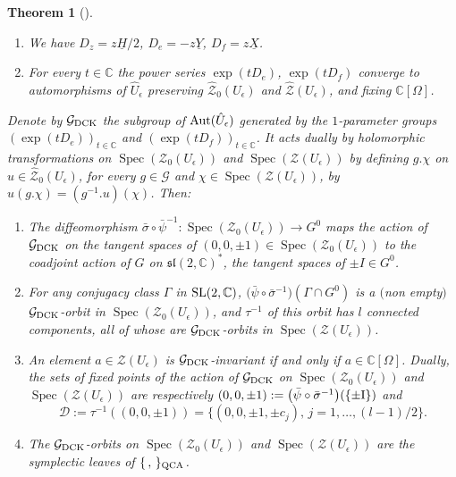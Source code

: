 \documentclass[pdftex]{sigma}%
\numberwithin{equation}{section}
\numberwithin{figure}{section}
\newtheorem{teo}{Theorem}[section]
\newcommand{\Ue}{U_\epsilon}
\newcommand{\e}{\epsilon}
\newcommand{\mc}{\mathbb{C}}
\newcommand{\Gg}{{\mathcal G}}
\newcommand{\ra}{\rightarrow}
\begin{document}
\begin{teo} [{\cite{DC-K-P1,DC-K-P2}}]\qquad\label{DCKPteo}

\begin{enumerate}\itemsep=0pt
\item[$(a)$] We have $D_{z} = z \underline{H}/2$, $D_e= -z\underline{Y}$, $D_f=z\underline{X}$.

\item[$(b)$] For every $t\in \mc$ the power series $\exp(tD_e)$, $\exp(tD_f)$ converge to automorphisms of $\hat{U}_\e$ preserving $\hat{\mathcal{Z}}_0(U_\epsilon)$ and $\hat{\mathcal{Z}}(U_\epsilon)$, and fixing $\mc[\Omega]$.
\end{enumerate}
 Denote by $\mathcal{G}_{\rm DCK}$ the subgroup of ${\rm Aut}(\hat{U}_\e)$ generated by the $1$-parameter groups $(\exp(tD_e))_{t\in \mathbb{C}}$ and $(\exp(tD_f))_{t\in \mathbb{C}}$. It acts dually by holomorphic transformations on $\operatorname{Spec}(\mathcal{Z}_0(U_\epsilon))$ and $\operatorname{Spec}(\mathcal{Z}(U_\epsilon))$ by defining $g.\chi$ on $u\in \hat{\mathcal{Z}}_0(U_\epsilon)$, for every $g\in \Gg$ and $\chi\in \operatorname{Spec}(\mathcal{Z}(U_\epsilon))$, by $u(g.\chi) = (g^{-1}.u)(\chi)$. Then:

\begin{enumerate}\itemsep=0pt

\item[$(c)$] The diffeomorphism $\bar \sigma \circ \bar \psi^{-1}\colon \operatorname{Spec}(\mathcal{Z}_0(U_\epsilon))\ra G^0$ maps the action of $\Gg_{\rm DCK}$ on the tangent spaces of $(0,0,\pm 1)\in \operatorname{Spec}(\mathcal{Z}_0(U_\epsilon))$ to the coadjoint action of $G$ on ${\mathfrak{sl}}(2,\mc)^*$, the tangent spaces of ${\pm I} \in G^0$.

\item[$(d)$] For any conjugacy class $\Gamma$ in ${\rm SL}(2,\mc)$, $\big(\bar \psi\circ \bar \sigma^{-1}\big)(\Gamma \cap G^0)$ is a $($non empty$)$ $\Gg_{\rm DCK}$-orbit in $\operatorname{Spec}(\mathcal{Z}_0(U_\epsilon))$, and $\tau^{-1}$ of this orbit has $l$ connected components, all of whose are $\Gg_{\rm DCK}$-orbits in $\operatorname{Spec}(\mathcal{Z}(U_\epsilon))$.

\item[$(e)$] An element $a\in {\mathcal{Z}}(\Ue)$ is $\mathcal{G}_{\rm DCK}$-invariant if and only if $a\in \mc[\Omega]$. Dually, the sets of fixed points of the action of $\mathcal{G}_{\rm DCK}$ on $\operatorname{Spec}(\mathcal{Z}_0(U_\epsilon))$ and $\operatorname{Spec}(\mathcal{Z}(U_\epsilon))$ are respectively $(0,0,\pm 1) := \big(\bar \psi \circ \bar \sigma^{-1}\big)(\{{\rm \pm I}\})$ and
\[
\mathcal{D} := \tau^{-1}((0,0,\pm 1)) = \{(0,0,\pm 1,\pm c_j), \, j=1,\dots,(l-1)/2\}.
\]

\item[$(f)$] The $\Gg_{\rm DCK}$-orbits on $\operatorname{Spec}(\mathcal{Z}_0(U_\epsilon))$ and $\operatorname{Spec}(\mathcal{Z}(U_\epsilon))$ are the symplectic leaves of $\{\, ,\, \}_{\rm QCA}$.

\end{enumerate}
\end{teo}
\end{document}
